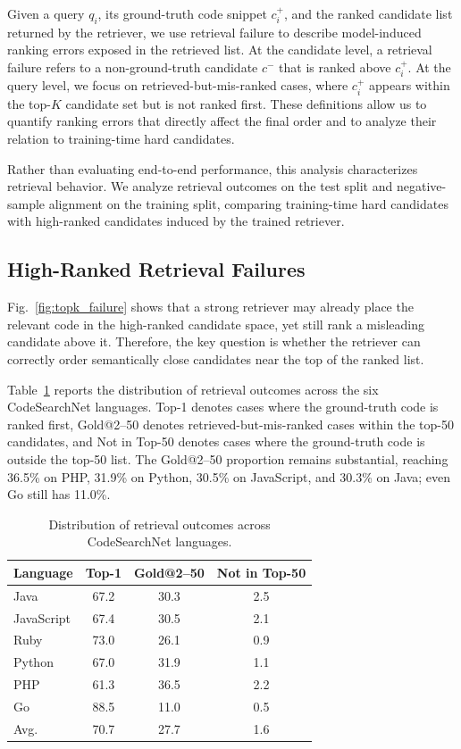 \documentclass[10pt,conference]{IEEEtran}
\begin{document}
Given a query $q_i$, its ground-truth code snippet $c_i^{+}$, and the ranked candidate list returned by the retriever, we use retrieval failure to describe model-induced ranking errors exposed in the retrieved list. At the candidate level, a retrieval failure refers to a non-ground-truth candidate $c^{-}$ that is ranked above $c_i^{+}$. At the query level, we focus on retrieved-but-mis-ranked cases, where $c_i^{+}$ appears within the top-$K$ candidate set but is not ranked first. These definitions allow us to quantify ranking errors that directly affect the final order and to analyze their relation to training-time hard candidates.

Rather than evaluating end-to-end performance, this analysis characterizes retrieval behavior. We analyze retrieval outcomes on the test split and negative-sample alignment on the training split, comparing training-time hard candidates with high-ranked candidates induced by the trained retriever.

\subsection{High-Ranked Retrieval Failures}

Fig.~\ref{fig:topk_failure} shows that a strong retriever may already place the relevant code in the high-ranked candidate space, yet still rank a misleading candidate above it. Therefore, the key question is whether the retriever can correctly order semantically close candidates near the top of the ranked list.

Table~\ref{tab:retrieval_outcomes} reports the distribution of retrieval outcomes across the six CodeSearchNet languages. Top-1 denotes cases where the ground-truth code is ranked first, Gold@2--50 denotes retrieved-but-mis-ranked cases within the top-50 candidates, and Not in Top-50 denotes cases where the ground-truth code is outside the top-50 list. The Gold@2--50 proportion remains substantial, reaching 36.5\% on PHP, 31.9\% on Python, 30.5\% on JavaScript, and 30.3\% on Java; even Go still has 11.0\%.

\begin{table}[t]
\centering
\caption{Distribution of retrieval outcomes across CodeSearchNet languages.}
\label{tab:retrieval_outcomes}
\footnotesize
\setlength{\tabcolsep}{4.2pt}
\renewcommand{\arraystretch}{1.10}
\begin{tabular*}{0.95\columnwidth}{@{\extracolsep{\fill}}lccc@{}}
\toprule
Language & Top-1 & Gold@2--50 & Not in Top-50 \\
\midrule
Java       & 67.2 & 30.3 & 2.5 \\
JavaScript & 67.4 & 30.5 & 2.1 \\
Ruby       & 73.0 & 26.1 & 0.9 \\
Python     & 67.0 & 31.9 & 1.1 \\
PHP        & 61.3 & 36.5 & 2.2 \\
Go         & 88.5 & 11.0 & 0.5 \\
\midrule
Avg.       & 70.7 & 27.7 & 1.6 \\
\bottomrule
\end{tabular*}
\end{table}
\end{document}
